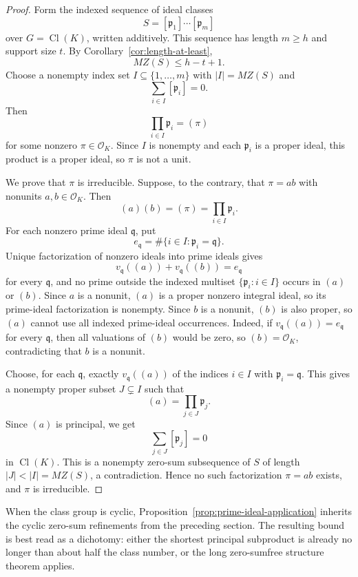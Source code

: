\documentclass[12pt,reqno]{amsart}
\theoremstyle{definition}
\theoremstyle{remark}
\newcommand{\Cl}{\operatorname{Cl}}
\newcommand{\cO}{\mathcal O}
\begin{document}
\begin{proof}
Form the indexed sequence of ideal classes
\[
  S=[\mathfrak p_1]\cdots[\mathfrak p_m]
\]
over $G=\Cl(K)$, written additively.  This sequence has length $m\ge h$ and support size $t$.  By Corollary~\ref{cor:length-at-least},
\[
  MZ(S)\le h-t+1.
\]
Choose a nonempty index set $I\subseteq\{1,\ldots,m\}$ with $|I|=MZ(S)$ and
\[
  \sum_{i\in I}[\mathfrak p_i]=0.
\]
Then
\[
  \prod_{i\in I}\mathfrak p_i=(\pi)
\]
for some nonzero $\pi\in\cO_K$.  Since $I$ is nonempty and each $\mathfrak p_i$ is a proper ideal, this product is a proper ideal, so $\pi$ is not a unit.

We prove that $\pi$ is irreducible.  Suppose, to the contrary, that $\pi=ab$ with nonunits $a,b\in\cO_K$.  Then
\[
  (a)(b)=(\pi)=\prod_{i\in I}\mathfrak p_i.
\]
For each nonzero prime ideal $\mathfrak q$, put
\[
  e_{\mathfrak q}=\#\{i\in I:\mathfrak p_i=\mathfrak q\}.
\]
Unique factorization of nonzero ideals into prime ideals gives
\[
  v_{\mathfrak q}((a))+v_{\mathfrak q}((b))=e_{\mathfrak q}
\]
for every $\mathfrak q$, and no prime outside the indexed multiset $\{\mathfrak p_i:i\in I\}$ occurs in $(a)$ or $(b)$.  Since $a$ is a nonunit, $(a)$ is a proper nonzero integral ideal, so its prime-ideal factorization is nonempty.  Since $b$ is a nonunit, $(b)$ is also proper, so $(a)$ cannot use all indexed prime-ideal occurrences.  Indeed, if $v_{\mathfrak q}((a))=e_{\mathfrak q}$ for every $\mathfrak q$, then all valuations of $(b)$ would be zero, so $(b)=\cO_K$, contradicting that $b$ is a nonunit.

Choose, for each $\mathfrak q$, exactly $v_{\mathfrak q}((a))$ of the indices $i\in I$ with $\mathfrak p_i=\mathfrak q$.  This gives a nonempty proper subset $J\subsetneq I$ such that
\[
  (a)=\prod_{j\in J}\mathfrak p_j.
\]
Since $(a)$ is principal, we get
\[
  \sum_{j\in J}[\mathfrak p_j]=0
\]
in $\Cl(K)$.  This is a nonempty zero-sum subsequence of $S$ of length $|J|<|I|=MZ(S)$, a contradiction.  Hence no such factorization $\pi=ab$ exists, and $\pi$ is irreducible.
\end{proof}

When the class group is cyclic, Proposition~\ref{prop:prime-ideal-application} inherits the cyclic zero-sum refinements from the preceding section.  The resulting bound is best read as a dichotomy: either the shortest principal subproduct is already no longer than about half the class number, or the long zero-sumfree structure theorem applies.
\end{document}
